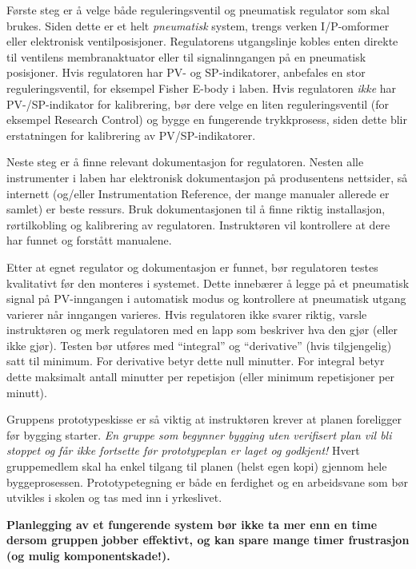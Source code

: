 \vskip 10pt

Første steg er å velge både reguleringsventil og pneumatisk regulator som skal brukes. Siden dette er et helt {\it pneumatisk} system, trengs verken I/P-omformer eller elektronisk ventilposisjoner. Regulatorens utgangslinje kobles enten direkte til ventilens membranaktuator eller til signalinngangen på en pneumatisk posisjoner. Hvis regulatoren har PV- og SP-indikatorer, anbefales en stor reguleringsventil, for eksempel Fisher E-body i laben. Hvis regulatoren {\it ikke} har PV-/SP-indikator for kalibrering, bør dere velge en liten reguleringsventil (for eksempel Research Control) og bygge en fungerende trykkprosess, siden dette blir erstatningen for kalibrering av PV/SP-indikatorer.

Neste steg er å finne relevant dokumentasjon for regulatoren. Nesten alle instrumenter i laben har elektronisk dokumentasjon på produsentens nettsider, så internett (og/eller Instrumentation Reference, der mange manualer allerede er samlet) er beste ressurs. Bruk dokumentasjonen til å finne riktig installasjon, rørtilkobling og kalibrering av regulatoren. Instruktøren vil kontrollere at dere har funnet og forstått manualene.

Etter at egnet regulator og dokumentasjon er funnet, bør regulatoren testes kvalitativt før den monteres i systemet. Dette innebærer å legge på et pneumatisk signal på PV-inngangen i automatisk modus og kontrollere at pneumatisk utgang varierer når inngangen varieres. Hvis regulatoren ikke svarer riktig, varsle instruktøren og merk regulatoren med en lapp som beskriver hva den gjør (eller ikke gjør). Testen bør utføres med ``integral'' og ``derivative'' (hvis tilgjengelig) satt til minimum. For derivative betyr dette null minutter. For integral betyr dette maksimalt antall minutter per repetisjon (eller minimum repetisjoner per minutt).

\vskip 10pt

Gruppens prototypeskisse er så viktig at instruktøren krever at planen foreligger før bygging starter. {\it En gruppe som begynner bygging uten verifisert plan vil bli stoppet og får ikke fortsette før prototypeplan er laget og godkjent!} Hvert gruppemedlem skal ha enkel tilgang til planen (helst egen kopi) gjennom hele byggeprosessen. Prototypetegning er både en ferdighet og en arbeidsvane som bør utvikles i skolen og tas med inn i yrkeslivet.

\vskip 10pt

{\bf Planlegging av et fungerende system bør ikke ta mer enn en time dersom gruppen jobber effektivt, og kan spare mange timer frustrasjon (og mulig komponentskade!).}




